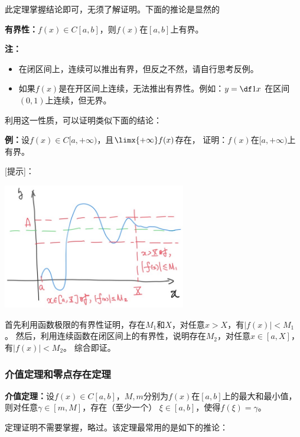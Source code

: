 此定理掌握结论即可，无须了解证明。下面的推论是显然的

\begin{thx}
	{\bf 有界性：}$f(x)\in C[a,b]$，则$f(x)$在$[a,b]$上有界。
\end{thx}

{\bf 注：}
\begin{itemize}
  \setlength{\itemindent}{1cm}
  \item 在闭区间上，连续可以推出有界，但反之不然，请自行思考反例。
  \item 如果$f(x)$是在开区间上连续，无法推出有界性。例如：$y=\df1x$
  在区间$(0,1)$上连续，但无界。 
\end{itemize}

利用这一性质，可以证明类似下面的结论：

{\bf 例：}设$f(x)\in C[a,+\infty)$，且$\limx{+\infty}f(x)$存在，
证明：$f(x)$在$[a,+\infty)$上有界。

[提示]：

\begin{center}
	\includegraphics[width=8cm]{./images/ch1/aiB.jpg}
\end{center}

首先利用函数极限的有界性证明，存在$M_1$和$X$，对任意$x>X$，有$|f(x)|<M_1$。
然后，利用连续函数在闭区间上的有界性，说明存在$M_2$，对任意$x\in[a,X]$，有$|f(x)|<M_2$。
综合即证。

\subsubsection{介值定理和零点存在定理}

\begin{thx}
	{\bf 介值定理：}设$f(x)\in C[a,b]$，$M,m$分别为$f(x)$在$[a,b]$上的最大和最小值，
	则对任意$\gamma\in[m,M]$，存在（至少一个）
	$\xi\in[a,b]$，使得$f(\xi)=\gamma$。
\end{thx}

定理证明不需要掌握，略过。该定理最常用的是如下的推论：

